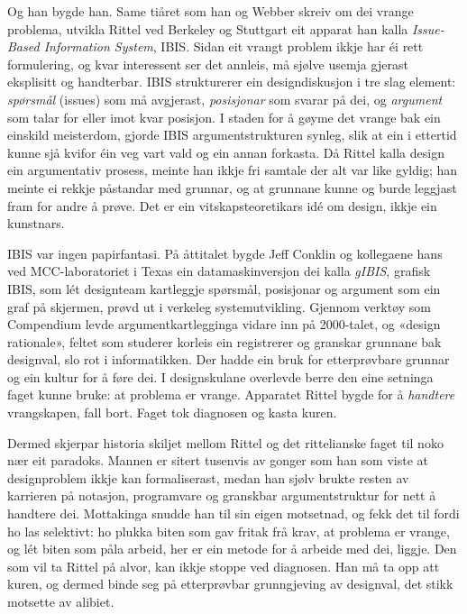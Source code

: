 Og han bygde han. Same tiåret som han og Webber skreiv om dei vrange problema, utvikla Rittel ved Berkeley og Stuttgart eit apparat han kalla \emph{Issue-Based Information System}, IBIS. Sidan eit vrangt problem ikkje har éi rett formulering, og kvar interessent ser det annleis, må sjølve usemja gjerast eksplisitt og handterbar. IBIS strukturerer ein designdiskusjon i tre slag element: \emph{spørsmål} (issues) som må avgjerast, \emph{posisjonar} som svarar på dei, og \emph{argument} som talar for eller imot kvar posisjon. I staden for å gøyme det vrange bak ein einskild meisterdom, gjorde IBIS argumentstrukturen synleg, slik at ein i ettertid kunne sjå kvifor éin veg vart vald og ein annan forkasta. Då Rittel kalla design ein argumentativ prosess, meinte han ikkje fri samtale der alt var like gyldig; han meinte ei rekkje påstandar med grunnar, og at grunnane kunne og burde leggjast fram for andre å prøve. Det er ein vitskapsteoretikars idé om design, ikkje ein kunstnars.

IBIS var ingen papirfantasi. På åttitalet bygde Jeff Conklin og kollegaene hans ved MCC-laboratoriet i Texas ein datamaskinversjon dei kalla \emph{gIBIS}, grafisk IBIS, som lét designteam kartleggje spørsmål, posisjonar og argument som ein graf på skjermen, prøvd ut i verkeleg systemutvikling. Gjennom verktøy som Compendium levde argumentkartlegginga vidare inn på 2000-talet, og «design rationale», feltet som studerer korleis ein registrerer og granskar grunnane bak designval, slo rot i informatikken. Der hadde ein bruk for etterprøvbare grunnar og ein kultur for å føre dei. I designskulane overlevde berre den eine setninga faget kunne bruke: at problema er vrange. Apparatet Rittel bygde for å \emph{handtere} vrangskapen, fall bort. Faget tok diagnosen og kasta kuren.

Dermed skjerpar historia skiljet mellom Rittel og det rittelianske faget til noko nær eit paradoks. Mannen er sitert tusenvis av gonger som han som viste at designproblem ikkje kan formaliserast, medan han sjølv brukte resten av karrieren på notasjon, programvare og granskbar argumentstruktur for nett å handtere dei. Mottakinga snudde han til sin eigen motsetnad, og fekk det til fordi ho las selektivt: ho plukka biten som gav fritak frå krav, at problema er vrange, og lét biten som påla arbeid, her er ein metode for å arbeide med dei, liggje. Den som vil ta Rittel på alvor, kan ikkje stoppe ved diagnosen. Han må ta opp att kuren, og dermed binde seg på etterprøvbar grunngjeving av designval, det stikk motsette av alibiet.

